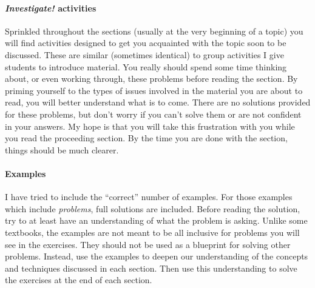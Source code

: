\documentclass[10pt,]{book}
\theoremstyle{plain}
\theoremstyle{definition}
\theoremstyle{definition}
\theoremstyle{definition}
\theoremstyle{definition}
\numberwithin{equation}{chapter}
\begin{document}
\paragraph[{\emph{Investigate!} activities}]{\emph{Investigate!} activities}\hypertarget{paragraphs-2}{}
\hypertarget{p-10}{}%
Sprinkled throughout the sections (usually at the very beginning of a topic) you will find activities designed to get you acquainted with the topic soon to be discussed. These are similar (sometimes identical) to group activities I give students to introduce material. You really should spend some time thinking about, or even working through, these problems before reading the section. By priming yourself to the types of issues involved in the material you are about to read, you will better understand what is to come. There are no solutions provided for these problems, but don't worry if you can't solve them or are not confident in your answers. My hope is that you will take this frustration with you while you read the proceeding section. By the time you are done with the section, things should be much clearer.%
\typeout{************************************************}
\typeout{************************************************}
\paragraph[{Examples}]{Examples}\hypertarget{paragraphs-3}{}
\hypertarget{p-11}{}%
I have tried to include the ``correct'' number of examples. For those examples which include \emph{problems}, full solutions are included. Before reading the solution, try to at least have an understanding of what the problem is asking. Unlike some textbooks, the examples are not meant to be all inclusive for problems you will see in the exercises. They should not be used as a blueprint for solving other problems. Instead, use the examples to deepen our understanding of the concepts and techniques discussed in each section. Then use this understanding to solve the exercises at the end of each section.%
\typeout{************************************************}
\typeout{************************************************}
\end{document}

